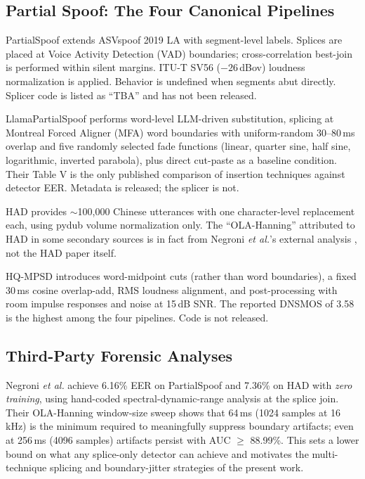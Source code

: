 \documentclass[conference]{IEEEtran}
\begin{document}
\subsection{Partial Spoof: The Four Canonical Pipelines}

PartialSpoof \cite{zhang2023partialspoof} extends ASVspoof 2019 LA with segment-level labels. Splices are placed at Voice Activity Detection (VAD) boundaries; cross-correlation best-join is performed within silent margins. ITU-T SV56 ($-26$\,dBov) loudness normalization is applied. Behavior is undefined when segments abut directly. Splicer code is listed as ``TBA'' and has not been released.

LlamaPartialSpoof \cite{luong2024llama} performs word-level LLM-driven substitution, splicing at Montreal Forced Aligner (MFA) word boundaries with uniform-random 30--80\,ms overlap and five randomly selected fade functions (linear, quarter sine, half sine, logarithmic, inverted parabola), plus direct cut-paste as a baseline condition. Their Table V is the only published comparison of insertion techniques against detector EER. Metadata is released; the splicer is not.

HAD \cite{yi2021had} provides $\sim$100{,}000 Chinese utterances with one character-level replacement each, using pydub volume normalization only. The ``OLA-Hanning'' attributed to HAD in some secondary sources is in fact from Negroni \emph{et al.}'s external analysis \cite{negroni2024splicing}, not the HAD paper itself.

HQ-MPSD \cite{li2025hqmpsd} introduces word-midpoint cuts (rather than word boundaries), a fixed 30\,ms cosine overlap-add, RMS loudness alignment, and post-processing with room impulse responses and noise at 15\,dB SNR. The reported DNSMOS of 3.58 is the highest among the four pipelines. Code is not released.

\subsection{Third-Party Forensic Analyses}

Negroni \emph{et al.} \cite{negroni2024splicing} achieve 6.16\% EER on PartialSpoof and 7.36\% on HAD with \emph{zero training}, using hand-coded spectral-dynamic-range analysis at the splice join. Their OLA-Hanning window-size sweep shows that 64\,ms (1024 samples at 16\,kHz) is the minimum required to meaningfully suppress boundary artifacts; even at 256\,ms (4096 samples) artifacts persist with AUC $\geq$ 88.99\%. This sets a lower bound on what any splice-only detector can achieve and motivates the multi-technique splicing and boundary-jitter strategies of the present work.
\end{document}
